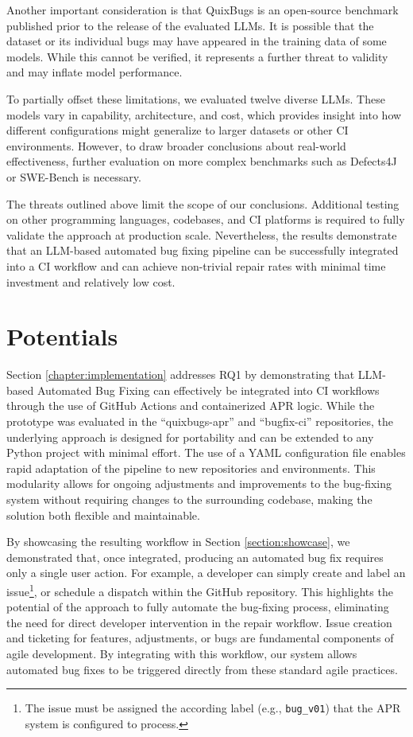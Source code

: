 Another important consideration is that QuixBugs is an open-source benchmark published prior to the release of the evaluated \acp{LLM}. It is possible that the dataset or its individual bugs may have appeared in the training data of some models. While this cannot be verified, it represents a further threat to validity and may inflate model performance.

To partially offset these limitations, we evaluated twelve diverse \acp{LLM}. These models vary in capability, architecture, and cost, which provides insight into how different configurations might generalize to larger datasets or other CI environments. However, to draw broader conclusions about real-world effectiveness, further evaluation on more complex benchmarks such as Defects4J or SWE-Bench is necessary.

The threats outlined above limit the scope of our conclusions. Additional testing on other programming languages, codebases, and CI platforms is required to fully validate the approach at production scale. Nevertheless, the results demonstrate that an LLM-based automated bug fixing pipeline can be successfully integrated into a CI workflow and can achieve non-trivial repair rates with minimal time investment and relatively low cost.

\section{Potentials}

Section \ref{chapter:implementation} addresses RQ1 by demonstrating that LLM-based Automated Bug Fixing can effectively be integrated into \ac{CI} workflows through the use of GitHub Actions and containerized APR logic. While the prototype was evaluated in the ``quixbugs-apr'' and ``bugfix-ci'' repositories, the underlying approach is designed for portability and can be extended to any Python project with minimal effort. The use of a YAML configuration file enables rapid adaptation of the pipeline to new repositories and environments. This modularity allows for ongoing adjustments and improvements to the bug-fixing system without requiring changes to the surrounding codebase, making the solution both flexible and maintainable.

By showcasing the resulting workflow in Section \ref{section:showcase}, we demonstrated that, once integrated, producing an automated bug fix requires only a single user action. For example, a developer can simply create and label an issue\footnote{The issue must be assigned the according label (e.g., \texttt{bug\_v01}) that the APR system is configured to process.}, or schedule a dispatch within the GitHub repository. This highlights the potential of the approach to fully automate the bug-fixing process, eliminating the need for direct developer intervention in the repair workflow. Issue creation and ticketing for features, adjustments, or bugs are fundamental components of agile development. By integrating with this workflow, our system allows automated bug fixes to be triggered directly from these standard agile practices.

